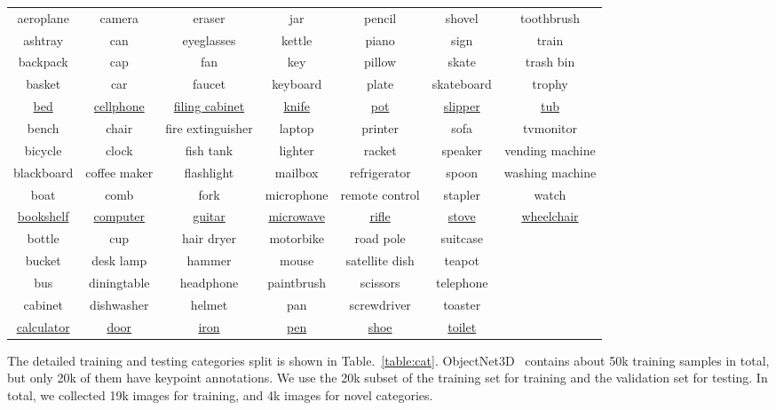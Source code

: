 \documentclass[runningheads]{llncs}
\begin{document}
\begin{table*} [t]
 \begin{center} 
 \tiny
 \begin{tabular}{c|c|c|c|c|c|c} 
 \hline
aeroplane & camera & eraser & jar & pencil & shovel & toothbrush   \\
ashtray & can & eyeglasses & kettle & piano & sign & train   \\
backpack & cap & fan & key & pillow & skate & trash bin   \\
basket & car & faucet & keyboard & plate & skateboard & trophy   \\
\underline{bed} & \underline{cellphone} & \underline{filing cabinet} & \underline{knife} & \underline{pot} & \underline{slipper} & \underline{tub}   \\
bench & chair & fire extinguisher & laptop & printer & sofa & tvmonitor   \\
bicycle & clock & fish tank & lighter & racket & speaker & vending machine   \\
blackboard & coffee maker & flashlight & mailbox & refrigerator & spoon & washing machine   \\
boat & comb & fork & microphone & remote control & stapler & watch   \\
\underline{bookshelf} & \underline{computer} & \underline{guitar} & \underline{microwave} & \underline{rifle} & \underline{stove} & \underline{wheelchair}   \\
bottle & cup & hair dryer & motorbike & road pole & suitcase &    \\
bucket & desk lamp & hammer & mouse & satellite dish & teapot &    \\
bus & diningtable & headphone & paintbrush & scissors & telephone &    \\
cabinet & dishwasher & helmet & pan & screwdriver & toaster &    \\
\underline{calculator} & \underline{door} & \underline{iron} & \underline{pen} & \underline{shoe} & \underline{toilet} &    \\
\hline
\end{tabular} 
{\caption{List of categories on ObjectNet3D~\cite{xiang2016objectnet3d}. The novel categories (only used for testing) is shown in underline.}
\label{table:cat}}
\end{center} 

\end{table*}


The detailed training and testing categories split is shown in Table.~\ref{table:cat}.
ObjectNet3D~\cite{xiang2016objectnet3d} contains about 50k training samples in total, but only 20k of them have keypoint annotations. 
We use the 20k subset of the training set for training and the validation set for testing. In total, we collected 19k images for training, and 4k images for novel categories.
\end{document}
